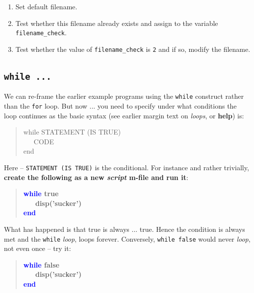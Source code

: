 \documentclass{tufte-book} %
\newenvironment{docspec}{\begin{quotation}\ttfamily\parskip0pt\parindent0pt\ignorespaces}{\end{quotation}}
\newenvironment{docspecbold}{\begin{quotation}\ttfamily\bfseries\parskip0pt\parindent0pt\ignorespaces}{\end{quotation}}
\begin{document}
\begin{enumerate}[noitemsep]
\setlength{\itemindent}{.2in}
\item Set default filename.
\item Test whether this filename already exists and assign to the variable \texttt{filename\_check}.
\item Test whether the value of \texttt{filename\_check} is \texttt{2} and if so, modify the filename.
\end{enumerate}


\subsection{\texttt{while ...}}

We can re-frame the earlier example programs using the \texttt{while} construct rather than the \texttt{for} loop. But now ... you need to specify under what conditions the loop continues as the basic syntax (see earlier margin text on \textit{loops}, or \textbf{help}) is:

\begin{docspec}
while STATEMENT (IS TRUE)
\\ \ \ \ CODE
\\end
\end{docspec}

Here -- \texttt{STATEMENT (IS TRUE)} is the conditional. For instance and rather trivially, \textbf{create the following as a new \textit{script} m-file and run it}:

\begin{docspecbold}
\textcolor{blue}{while} true
\\ \ \ \ disp('sucker')
\\\textcolor{blue}{end}
\end{docspecbold}

What has happened is that true is always ... true. Hence the condition is always met and the \texttt{while} \textit{loop}, loops forever. Conversely, \texttt{while false} would never \textit{loop}, not even once -- try it:

\begin{docspecbold}
\textcolor{blue}{while} false
\\ \ \ \ disp('sucker')
\\\textcolor{blue}{end}
\end{docspecbold}
\end{document}
